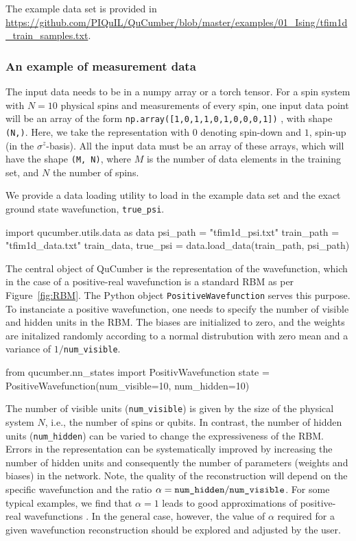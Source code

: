 \documentclass[submission, Phys]{SciPost}
\begin{document}
The example data set is provided in \url{https://github.com/PIQuIL/QuCumber/blob/master/examples/01_Ising/tfim1d_train_samples.txt}.

\subsubsection{An example of measurement data}
\label{subsec:example}

The input data needs to be in a numpy array or a torch tensor.
For a spin system with $N=10$ physical spins and measurements of every spin, one input data point will be an array of the form
\verb|np.array([1,0,1,1,0,1,0,0,0,1])|
, with shape \verb|(N,)|.
Here, we take the representation with $0$ denoting spin-down and $1$, spin-up (in the $\sigma^z$-basis).
All the input data must be an array of these arrays, which will have the shape \verb|(M, N)|, where $M$ is the number of data elements in the training set, and $N$ the number of spins.

We provide a data loading utility to load in the example data set and the exact ground state wavefunction, \verb|true_psi|.
\begin{python}
import qucumber.utils.data as data
psi_path = "tfim1d_psi.txt"
train_path = "tfim1d_data.txt"
train_data, true_psi = data.load_data(train_path, psi_path)
\end{python}

The central object of QuCumber is the representation of the wavefunction, which in the case of a positive-real wavefunction
is a standard RBM as per Figure~\ref{fig:RBM}.
The Python object \verb|PositiveWavefunction| serves this purpose.
To instanciate a positive wavefunction, one needs to specify the number of visible and hidden units in the RBM.
The biases are initialized to zero, and the weights are initalized randomly according to a normal distrubution with zero mean and a variance of $1/$\verb|num_visible|.
\begin{python}
from qucumber.nn_states import PositivWavefunction
state = PositiveWavefunction(num_visible=10, num_hidden=10)
\end{python}
The number of visible units (\verb|num_visible|) is given by the size of the physical system $N$, i.e., the number of spins or qubits.
In contrast, the number of hidden units (\verb|num_hidden|) can be varied to change the expressiveness of the RBM.
Errors in the representation can be systematically improved by increasing the number of hidden units and consequently
the number of parameters (weights and biases) in the network.
Note, the quality of the reconstruction will depend on the specific wavefunction and the ratio $\alpha = \verb|num_hidden|/\verb|num_visible|$.
For some typical examples, we find that $\alpha = 1$ leads to good approximations of positive-real wavefunctions \cite{Torlai2016thermo}.
In the general case, however, the value of $\alpha$ required for a given wavefunction reconstruction should be explored and adjusted by the user.
\end{document}
